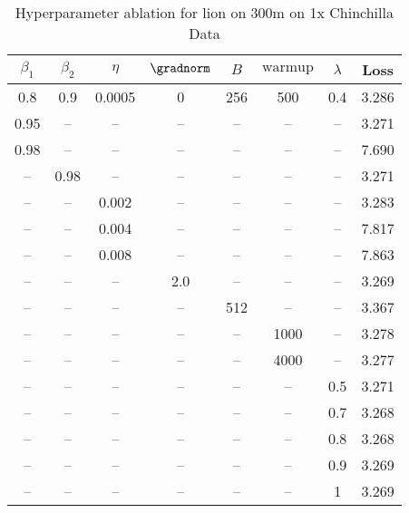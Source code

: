 \begin{table}[h!]
\centering
\caption{Hyperparameter ablation for lion on 300m on 1x Chinchilla Data}
\label{tab:ablation_lion_300m_on_1x_chinchilla_data}
\begin{tabular}{cccccccc}
\toprule
$\beta_1$ & $\beta_2$ & $\eta$ & $\gradnorm$ & $B$ & $\mathrm{warmup}$ & $\lambda$ & Loss \\
\midrule
0.8 & 0.9 & 0.0005 & 0 & 256 & 500 & 0.4 & 3.286 \\
\midrule
0.95 & -- & -- & -- & -- & -- & -- & 3.271 \\
0.98 & -- & -- & -- & -- & -- & -- & 7.690 \\
-- & 0.98 & -- & -- & -- & -- & -- & 3.271 \\
-- & -- & 0.002 & -- & -- & -- & -- & 3.283 \\
-- & -- & 0.004 & -- & -- & -- & -- & 7.817 \\
-- & -- & 0.008 & -- & -- & -- & -- & 7.863 \\
-- & -- & -- & 2.0 & -- & -- & -- & 3.269 \\
-- & -- & -- & -- & 512 & -- & -- & 3.367 \\
-- & -- & -- & -- & -- & 1000 & -- & 3.278 \\
-- & -- & -- & -- & -- & 4000 & -- & 3.277 \\
-- & -- & -- & -- & -- & -- & 0.5 & 3.271 \\
-- & -- & -- & -- & -- & -- & 0.7 & 3.268 \\
-- & -- & -- & -- & -- & -- & 0.8 & 3.268 \\
-- & -- & -- & -- & -- & -- & 0.9 & 3.269 \\
-- & -- & -- & -- & -- & -- & 1 & 3.269 \\
\bottomrule
\end{tabular}
\end{table}

